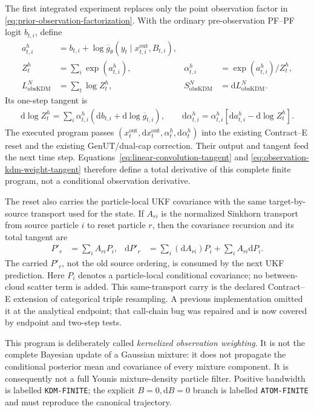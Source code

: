 \documentclass[11pt]{article}
\newcommand{\dd}{\mathrm{d}}
\newcommand{\GenUT}{\ensuremath{\mathrm{GenUT}}}
\begin{document}
The first integrated experiment replaces only the point observation factor in
\eqref{eq:prior-observation-factorization}.  With the ordinary
pre-observation PF--PF logit $b_{t,i}$, define
\begin{align}
 a^h_{t,i}&=b_{t,i}+\log\overline g_\theta(
   y_t\mid x_{t,i}^{\mathrm{out}},B_{t,i}),\\
 Z^h_t&=\sum_i\exp(a^h_{t,i}), &
 \alpha^h_{t,i}&=\exp(a^h_{t,i})/Z^h_t,\\
 L_{\mathrm{obsKDM}}^N&=\sum_t\log Z^h_t, &
 S_{\mathrm{obsKDM}}^N&=\dd L_{\mathrm{obsKDM}}^N.
 \label{eq:observation-kdm-program}
\end{align}
Its one-step tangent is
\begin{align}
 \dd\log Z^h_t
 =\sum_i\alpha^h_{t,i}
   \left(\dd b_{t,i}+\dd\log\overline g_{t,i}\right),\qquad
 \dd\alpha^h_{t,i}
 =\alpha^h_{t,i}\left[
   \dd a^h_{t,i}-\dd\log Z^h_t\right].
 \label{eq:observation-kdm-weight-tangent}
\end{align}
The executed program passes $(x_t^{\mathrm{out}},\dd x_t^{\mathrm{out}},
\alpha_t^h,\dd\alpha_t^h)$ into the existing Contract--E reset and the
existing \GenUT{}/dual-cap correction.  Their output and tangent feed the next
time step.  Equations~\eqref{eq:linear-convolution-tangent} and
\eqref{eq:observation-kdm-weight-tangent} therefore define a total derivative
of this complete finite program, not a conditional observation derivative.

The reset also carries the particle-local UKF covariance with the same
target-by-source transport used for the state.  If $A_{ri}$ is the normalized
Sinkhorn transport from source particle $i$ to reset particle $r$, then the
covariance recursion and its total tangent are
\begin{align}
 P'_{r} &= \sum_i A_{ri}P_i, &
 \dd P'_{r} &= \sum_i (\dd A_{ri})P_i+
                    \sum_i A_{ri}\dd P_i.\label{eq:covariance-carry}
\end{align}
The carried $P'_r$, not the old source ordering, is consumed by the next UKF
prediction.  Here $P_i$ denotes a particle-local conditional covariance; no
between-cloud scatter term is added.  This same-transport carry is the
declared Contract--E extension of categorical triple resampling.  A previous
implementation omitted it at the analytical endpoint; that call-chain bug
was repaired and is now covered by endpoint and two-step tests.

This program is deliberately called \emph{kernelized observation weighting}.
It is not the complete Bayesian update of a Gaussian mixture: it does not
propagate the conditional posterior mean and covariance of every mixture
component.  It is consequently not a full Younis mixture-density particle
filter.  Positive bandwidth is labelled \texttt{KDM-FINITE}; the explicit
$B=0,\dd B=0$ branch is labelled \texttt{ATOM-FINITE} and must reproduce the
canonical trajectory.
\end{document}
